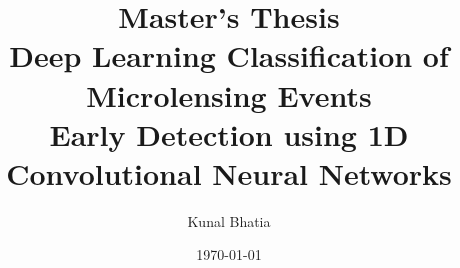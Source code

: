 
\title{
    {\large Master's Thesis}\\[1cm]
    {\Huge\bfseries Deep Learning Classification of\\[0.3cm]
    Microlensing Events}\\[0.5cm]
    {\large Early Detection using 1D Convolutional Neural Networks}
}

\author{Kunal Bhatia}

\date{\today}

\newcommand{\thesistype}{Master of Science Thesis}
\newcommand{\department}{Department of Astronomy}
\newcommand{\university}{[Your University Name]}
\newcommand{\supervisor}{[Supervisor Name]}
